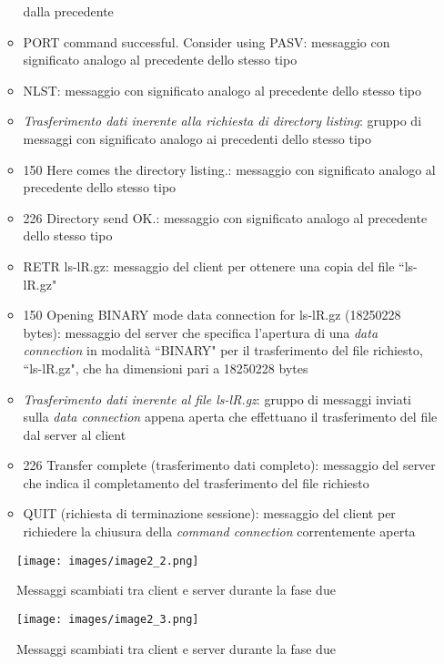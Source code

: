 \documentclass[a4paper, 12pt]{report}
\begin{document}
\begin{enumerate}
\begin{itemize}
            dalla precedente
            \item PORT command successful. Consider using PASV: messaggio con significato analogo al precedente dello stesso tipo
            \item NLST: messaggio con significato analogo al precedente dello stesso tipo
            \item \textit{Trasferimento dati inerente alla richiesta di directory listing}: gruppo di messaggi con significato analogo ai precedenti dello stesso tipo
	        \item 150 Here comes the directory listing.: messaggio con significato analogo al precedente dello stesso tipo
	        \item 226 Directory send OK.: messaggio con significato analogo al precedente dello stesso tipo
            \item RETR ls-lR.gz: messaggio del client per ottenere una copia del file ``ls-lR.gz"
            \item 150 Opening BINARY mode data connection for ls-lR.gz (18250228 bytes): messaggio del server che specifica l'apertura di una \textit{data connection}
            in modalità ``BINARY" per il trasferimento del file richiesto, ``ls-lR.gz", che ha dimensioni pari a 18250228 bytes
            \item \textit{Trasferimento dati inerente al file ls-lR.gz}: gruppo di messaggi inviati sulla \textit{data connection} appena aperta che effettuano il
            trasferimento del file dal server al client
            \item 226 Transfer complete (trasferimento dati completo): messaggio del server che indica il completamento del trasferimento del file richiesto
            \item QUIT (richiesta di terminazione sessione): messaggio del client per richiedere la chiusura della \textit{command connection} correntemente aperta
        \end{itemize}
\end{enumerate}

\begin{figure}[H]
	\centering
	\texttt{[image: images/image2\_2.png]}
	\caption{Messaggi scambiati tra client e server durante la fase due}
\end{figure}

\begin{figure}[H]
	\centering
	\texttt{[image: images/image2\_3.png]}
	\caption{Messaggi scambiati tra client e server durante la fase due}
\end{figure}
\end{document}
